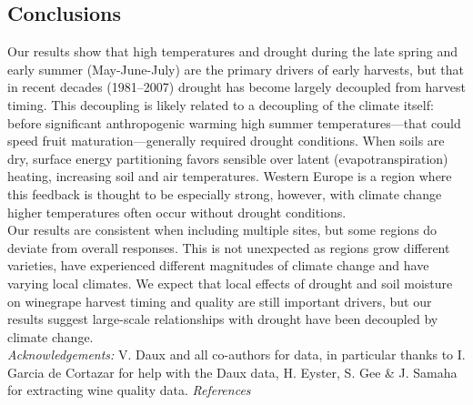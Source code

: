\documentclass[portrait,a0,final] {a0poster} %
\begin{document}
\begin{multicols}{2}
\section*{Conclusions}
Our results show that high temperatures and drought during the late spring and early summer (May-June-July) are the primary drivers of early harvests, but that in recent decades (1981--2007) drought has become largely decoupled from harvest timing. This decoupling is likely related to a decoupling of the climate itself: before significant anthropogenic warming high summer temperatures---that could speed fruit maturation---generally required drought conditions. When soils are dry, surface energy partitioning favors sensible over latent (evapotranspiration) heating, increasing soil and air temperatures. Western Europe is a region where this feedback is thought to be especially strong, however, with climate change higher temperatures often occur without drought conditions.\\ 

Our results are consistent when including multiple sites, but some regions do deviate from overall responses. This is not unexpected as regions grow different varieties, have experienced different magnitudes of climate change and have varying local climates. We expect that local effects of drought and soil moisture on winegrape harvest timing and quality are still important drivers, but our results suggest large-scale relationships with drought have been decoupled by climate change. \\

\emph{Acknowledgements:} V. Daux and all co-authors for data, in particular thanks to I. Garcia de Cortazar for help with the Daux data, H. Eyster, S. Gee \& J. Samaha for extracting wine quality data.
\vspace{2ex}
\emph{References}

{\def\section*#1{}

}

\end{multicols}
\end{document}
